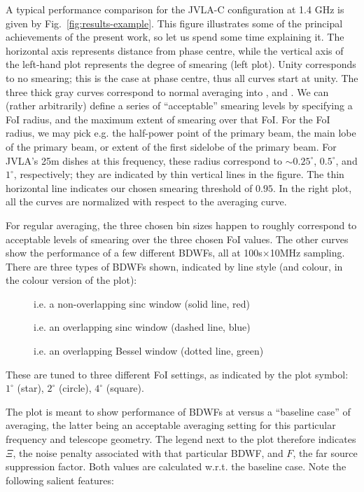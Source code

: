 \documentclass[useAMS,usenatbib]{mn2e}
\begin{document}
A typical performance comparison for the JVLA-C configuration at 1.4 GHz is given by Fig.~\ref{fig:results-example}.
This figure illustrates some of the principal achievements of the present work, so let us spend some time explaining it.
The horizontal axis represents distance from phase centre, while the vertical axis of the left-hand plot represents  the
degree of smearing (left plot). Unity corresponds to no smearing; this is the case at phase centre, thus all curves
start at unity. The three thick gray curves correspond to normal averaging into ,  and
. We can (rather arbitrarily) define a series of ``acceptable'' smearing levels by specifying a  FoI
radius, and the maximum extent of smearing over that FoI. For the FoI radius, we may pick e.g. the half-power point  of
the primary beam, the main lobe of the primary beam, or extent of the first sidelobe of the primary beam. For JVLA's 25m dishes at this frequency,
these radius correspond to $\sim0.25^\circ$, $0.5^\circ$, and $1^\circ$, respectively; they are indicated by thin
vertical lines in the figure. The thin horizontal line indicates our chosen smearing threshold of $0.95$. In the right
plot,  all the curves are normalized with respect to the  averaging curve.

For regular averaging, the three chosen bin sizes happen to roughly correspond to acceptable levels of smearing over the
three chosen FoI values. The other curves show the performance of a few different BDWFs, all at 100s$\times$10MHz
sampling. There are three types of BDWFs shown, indicated by line style (and colour, in the colour version of the plot):
\begin{description}
\item[] i.e. a non-overlapping sinc window (solid line, red)
\item[] i.e. an overlapping sinc window (dashed line, blue)
\item[] i.e. an overlapping Bessel window (dotted line, green)
\end{description}
These are tuned to three different FoI settings, as indicated by the plot symbol: $1^\circ$ (star), $2^\circ$ (circle),
$4^\circ$ (square). 

The plot is meant to show performance of BDWFs at  versus a ``baseline case'' of  averaging, 
the latter being an acceptable averaging setting for this particular frequency and telescope geometry. The legend 
next to the plot therefore indicates $\Xi$, the noise penalty associated with that particular BDWF, and $F$, the 
far source suppression factor. Both values are calculated w.r.t. the baseline case. Note the following salient features:
\end{document}
